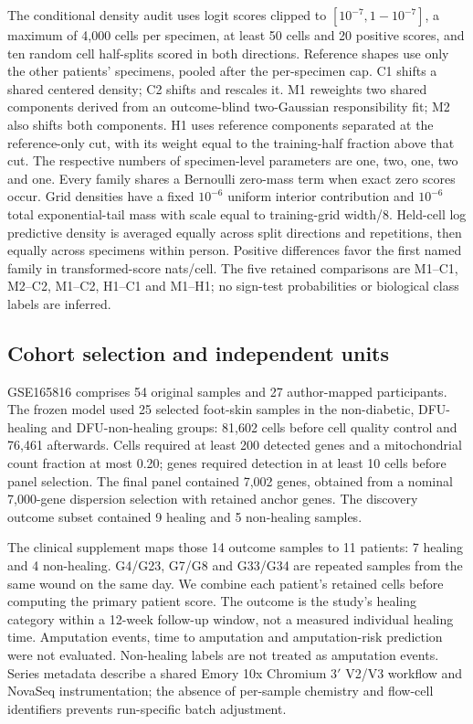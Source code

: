 The conditional density audit uses logit scores clipped to $[10^{-7},1-10^{-7}]$, a maximum of 4,000 cells per specimen, at least 50 cells and 20 positive scores, and ten random cell half-splits scored in both directions. Reference shapes use only the other patients' specimens, pooled after the per-specimen cap. C1 shifts a shared centered density; C2 shifts and rescales it. M1 reweights two shared components derived from an outcome-blind two-Gaussian responsibility fit; M2 also shifts both components. H1 uses reference components separated at the reference-only cut, with its weight equal to the training-half fraction above that cut. The respective numbers of specimen-level parameters are one, two, one, two and one. Every family shares a Bernoulli zero-mass term when exact zero scores occur. Grid densities have a fixed $10^{-6}$ uniform interior contribution and $10^{-6}$ total exponential-tail mass with scale equal to training-grid width/8. Held-cell log predictive density is averaged equally across split directions and repetitions, then equally across specimens within person. Positive differences favor the first named family in transformed-score nats/cell. The five retained comparisons are M1--C1, M2--C2, M1--C2, H1--C1 and M1--H1; no sign-test probabilities or biological class labels are inferred.
\subsection{Cohort selection and independent units}
GSE165816 comprises 54 original samples and 27 author-mapped participants. The frozen model used 25 selected foot-skin samples in the non-diabetic, DFU-healing and DFU-non-healing groups: 81,602 cells before cell quality control and 76,461 afterwards. Cells required at least 200 detected genes and a mitochondrial count fraction at most 0.20; genes required detection in at least 10 cells before panel selection. The final panel contained 7,002 genes, obtained from a nominal 7,000-gene dispersion selection with retained anchor genes. The discovery outcome subset contained 9 healing and 5 non-healing samples.

The clinical supplement maps those 14 outcome samples to 11 patients: 7 healing and 4 non-healing. G4/G23, G7/G8 and G33/G34 are repeated samples from the same wound on the same day. We combine each patient's retained cells before computing the primary patient score. The outcome is the study's healing category within a 12-week follow-up window, not a measured individual healing time. Amputation events, time to amputation and amputation-risk prediction were not evaluated. Non-healing labels are not treated as amputation events. Series metadata describe a shared Emory 10x Chromium 3$'$ V2/V3 workflow and NovaSeq instrumentation; the absence of per-sample chemistry and flow-cell identifiers prevents run-specific batch adjustment.

